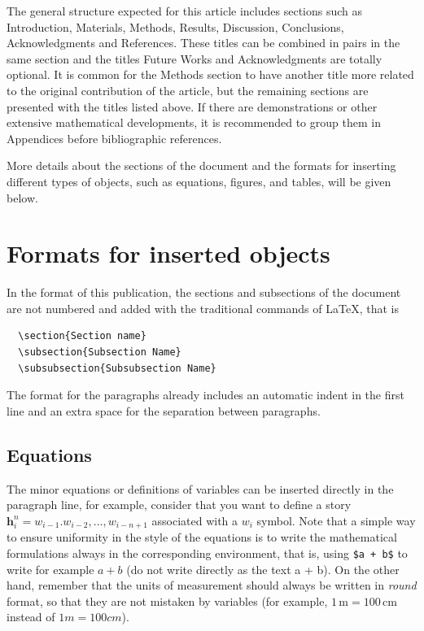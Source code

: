 \documentclass[eng]{ajceam-class}
\newcommand{\vect}[1]{\mathbf{#1}}  %
\begin{document}
The general structure expected for this article includes sections such as Introduction, Materials, Methods, Results, Discussion, Conclusions, Acknowledgments and References. These titles can be combined in pairs in the same section and the titles Future Works and Acknowledgments are totally optional. It is common for the Methods section to have another title more related to the original contribution of the article, but the remaining sections are presented with the titles listed above. If there are demonstrations or other extensive mathematical developments, it is recommended to group them in Appendices before bibliographic references.

More details about the sections of the document and the formats for inserting different types of objects, such as equations, figures, and tables, will be given below.

\section{Formats for inserted objects}

In the format of this publication, the sections and subsections of the document are not numbered and added with the traditional commands of \LaTeX, that is

\begin{verbatim}
  \section{Section name}
  \subsection{Subsection Name}
  \subsubsection{Subsubsection Name}
\end{verbatim}

The format for the paragraphs already includes an automatic indent in the first line and an extra space for the separation between paragraphs.

\subsection{Equations}

The minor equations or definitions of variables can be inserted directly in the paragraph line, for example, consider that you want to define a story $\vect{h}_i^n = w_{i-1}. w_{i-2}, \dots, w_{i-n+1}$ associated with a $w_i$ symbol. Note that a simple way to ensure uniformity in the style of the equations is to write the mathematical formulations always in the corresponding environment, that is, using \verb!$a + b$! to write for example $a + b$ (do not write directly as the text a + b). On the other hand, remember that the units of measurement should always be written in \emph{round} format, so that they are not mistaken by variables (for example, $1\,\text{m} = 100\,\text{cm}$ instead of $1m = 100cm$).
\end{document}
